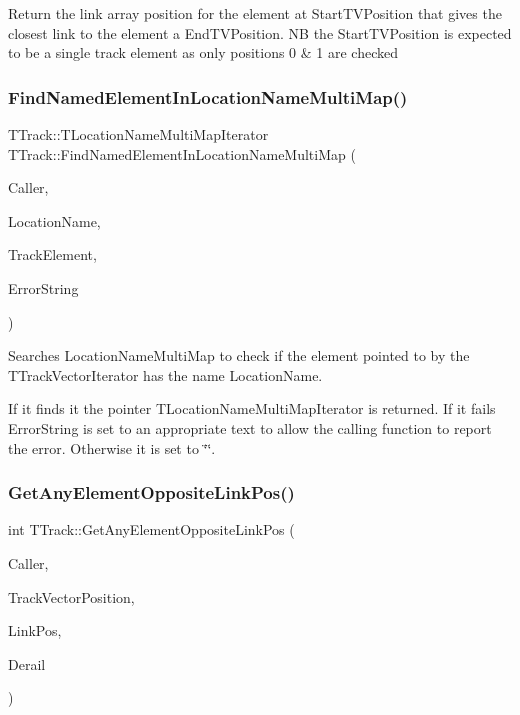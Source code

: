 Return the link array position for the element at Start\+T\+V\+Position that gives the closest link to the element a End\+T\+V\+Position. NB the Start\+T\+V\+Position is expected to be a single track element as only positions 0 \& 1 are checked \mbox{\label{class_t_track_a694370e3ec67d43da1d8333e06d9ebba}} 
\subsubsection{\texorpdfstring{Find\+Named\+Element\+In\+Location\+Name\+Multi\+Map()}{FindNamedElementInLocationNameMultiMap()}}
{\footnotesize\ttfamily T\+Track\+::\+T\+Location\+Name\+Multi\+Map\+Iterator T\+Track\+::\+Find\+Named\+Element\+In\+Location\+Name\+Multi\+Map (\begin{DoxyParamCaption}\item[{int}]{Caller,  }\item[{Ansi\+String}]{Location\+Name,  }\item[{T\+Track\+Vector\+Iterator}]{Track\+Element,  }\item[{Ansi\+String \&}]{Error\+String }\end{DoxyParamCaption})}

Searches Location\+Name\+Multi\+Map to check if the element pointed to by the T\+Track\+Vector\+Iterator has the name Location\+Name.

If it finds it the pointer T\+Location\+Name\+Multi\+Map\+Iterator is returned. If it fails Error\+String is set to an appropriate text to allow the calling function to report the error. Otherwise it is set to \char`\"{}\char`\"{}. \mbox{\label{class_t_track_a5b63dde2b21a37d5db7e4d078b03a74c}} 
\subsubsection{\texorpdfstring{Get\+Any\+Element\+Opposite\+Link\+Pos()}{GetAnyElementOppositeLinkPos()}}
{\footnotesize\ttfamily int T\+Track\+::\+Get\+Any\+Element\+Opposite\+Link\+Pos (\begin{DoxyParamCaption}\item[{int}]{Caller,  }\item[{int}]{Track\+Vector\+Position,  }\item[{int}]{Link\+Pos,  }\item[{bool \&}]{Derail }\end{DoxyParamCaption})}

